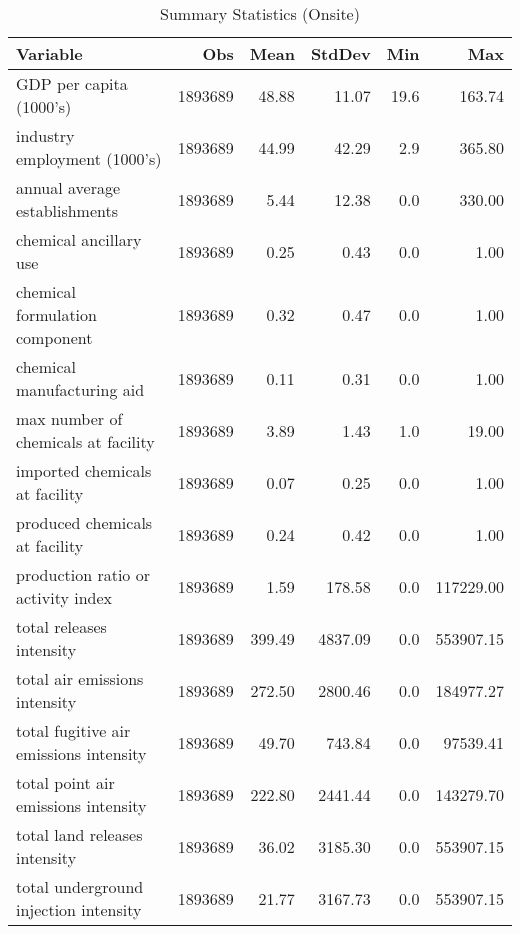 \begin{table}[H]
    \centering
    \caption{Summary Statistics (Onsite)}
    \label{tab:sumstat-onsite}
    \begin{tabular}{lrrrrr}
        \toprule \toprule
        Variable                                    & Obs     & Mean   & StdDev  & Min  & Max       \\ \midrule
        GDP per capita (1000's)                     & 1893689 & 48.88  & 11.07   & 19.6 & 163.74    \\
        industry employment (1000's)                & 1893689 & 44.99  & 42.29   & 2.9  & 365.80    \\
        annual average establishments               & 1893689 & 5.44   & 12.38   & 0.0  & 330.00    \\
        chemical ancillary use                      & 1893689 & 0.25   & 0.43    & 0.0  & 1.00      \\
        chemical formulation component              & 1893689 & 0.32   & 0.47    & 0.0  & 1.00      \\
        chemical manufacturing aid                  & 1893689 & 0.11   & 0.31    & 0.0  & 1.00      \\
        max number of chemicals at facility         & 1893689 & 3.89   & 1.43    & 1.0  & 19.00     \\
        imported chemicals at facility              & 1893689 & 0.07   & 0.25    & 0.0  & 1.00      \\
        produced chemicals at facility              & 1893689 & 0.24   & 0.42    & 0.0  & 1.00      \\
        production ratio or activity index          & 1893689 & 1.59   & 178.58  & 0.0  & 117229.00 \\
        total releases intensity                    & 1893689 & 399.49 & 4837.09 & 0.0  & 553907.15 \\
        total air emissions intensity               & 1893689 & 272.50 & 2800.46 & 0.0  & 184977.27 \\
        total fugitive air emissions intensity      & 1893689 & 49.70  & 743.84  & 0.0  & 97539.41  \\
        total point air emissions intensity         & 1893689 & 222.80 & 2441.44 & 0.0  & 143279.70 \\
        total land releases intensity               & 1893689 & 36.02  & 3185.30 & 0.0  & 553907.15 \\
        total underground injection intensity       & 1893689 & 21.77  & 3167.73 & 0.0  & 553907.15 \\

\end{tabular}
\end{table}
